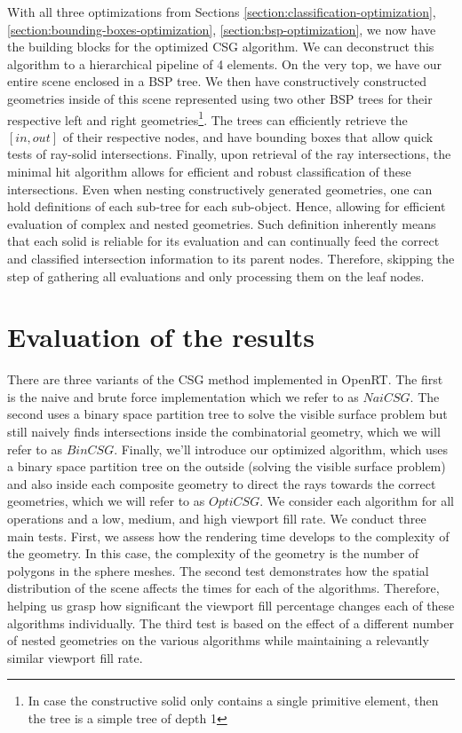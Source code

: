 \documentclass[a4paper,11pt,oneside]{article}
\begin{document}
With all three optimizations from Sections \ref{section:classification-optimization}, \ref{section:bounding-boxes-optimization}, \ref{section:bsp-optimization}, we now have the building blocks for the optimized CSG algorithm. We can deconstruct this algorithm to a hierarchical pipeline of 4 elements. On the very top, we have our entire scene enclosed in a BSP tree. We then have constructively constructed geometries inside of this scene represented using two other BSP trees for their respective left and right geometries\footnote{In case the constructive solid only contains a single primitive element, then the tree is a simple tree of depth 1}. The trees can efficiently retrieve the $[in, out]$ of their respective nodes, and have bounding boxes that allow quick tests of ray-solid intersections. Finally, upon retrieval of the ray intersections, the minimal hit algorithm allows for efficient and robust classification of these intersections. Even when nesting constructively generated geometries, one can hold definitions of each sub-tree for each sub-object. Hence, allowing for efficient evaluation of complex and nested geometries.  Such definition inherently means that each solid is reliable for its evaluation and can continually feed the correct and classified intersection information to its parent nodes. Therefore, skipping the step of gathering all evaluations and only processing them on the leaf nodes.

\section{Evaluation of the results}

There are three variants of the CSG method implemented in OpenRT. The first is the naive and brute force implementation which we refer to as $NaiCSG$. The second uses a binary space partition tree to solve the visible surface problem but still naively finds intersections inside the combinatorial geometry, which we will refer to as $BinCSG$. Finally, we'll introduce our optimized algorithm, which uses a binary space partition tree on the outside (solving the visible surface problem) and also inside each composite geometry to direct the rays towards the correct geometries, which we will refer to as $OptiCSG$. We consider each algorithm for all operations and a low, medium, and high viewport fill rate. We conduct three main tests. First, we assess how the rendering time develops to the complexity of the geometry. In this case, the complexity of the geometry is the number of polygons in the sphere meshes. The second test demonstrates how the spatial distribution of the scene affects the times for each of the algorithms. Therefore, helping us grasp how significant the viewport fill percentage changes each of these algorithms individually. The third test is based on the effect of a different number of nested geometries on the various algorithms while maintaining a relevantly similar viewport fill rate.
\end{document}
